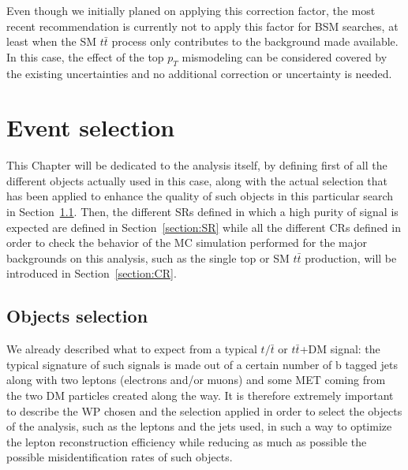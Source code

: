 \documentclass[a4paper, 10pt, openright]{report}
\begin{document}
Even though we initially planed on applying this correction factor, the most recent recommendation is currently not to apply this factor for \ac{BSM} searches, at least when the \ac{SM} $t \bar t$ process only contributes to the background \cite{topPtReweighting} made available. In this case, the effect of the top $p_T$ mismodeling can be considered covered by the existing uncertainties and no additional correction or uncertainty is needed.


























\chapter{Event selection} \label{chapter:Selection}

This Chapter will be dedicated to the analysis itself, by defining first of all the different objects actually used in this case, along with the actual selection that has been applied to enhance the quality of such objects in this particular search in Section~\ref{section:Selection}. Then, the different \acfp{SR} defined in which a high purity of signal is expected are defined in Section~\ref{section:SR} while all the different \acfp{CR} defined in order to check the behavior of the \ac{MC} simulation performed for the major backgrounds on this analysis, such as the single top or \ac{SM} $t \bar t$ production, will be introduced in Section~\ref{section:CR}. 

\section{Objects selection} \label{section:Selection}

We already described what to expect from a typical $t/\bar t$ or $t \bar t$+DM signal: the typical signature of such signals is made out of a certain number of b tagged jets along with two leptons (electrons and/or muons) and some \ac{MET} coming from the two \ac{DM} particles created along the way. It is therefore extremely important to describe the \ac{WP} chosen and the selection applied in order to select the objects of the analysis, such as the leptons and the jets used, in such a way to optimize the lepton reconstruction efficiency while reducing as much as possible the possible misidentification rates of such objects.
\end{document}
